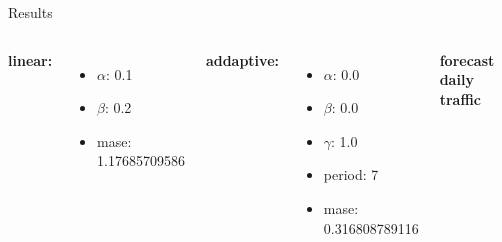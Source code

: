 \documentclass{beamer}
\begin{document}
    \begin{frame}{Results}
    \begin{columns}[c]
      \textbf{linear:}
      \begin{itemize}
	\item $\alpha$: 0.1 
	\item $\beta$: 0.2
	\item mase: 1.17685709586
      \end{itemize}
      
      \textbf{addaptive:}
      \begin{itemize}
	\item $\alpha$: 0.0 
	\item $\beta$: 0.0
	\item $\gamma$: 1.0
	\item period: 7
	\item mase: 0.316808789116
      \end{itemize}
    
      \textbf{forecast daily traffic}
      \begin{figure}
	\includegraphics[width=1.1\textwidth]{images/daily.png}
      \end{figure}
    \end{columns}
  \end{frame}
\end{document}
